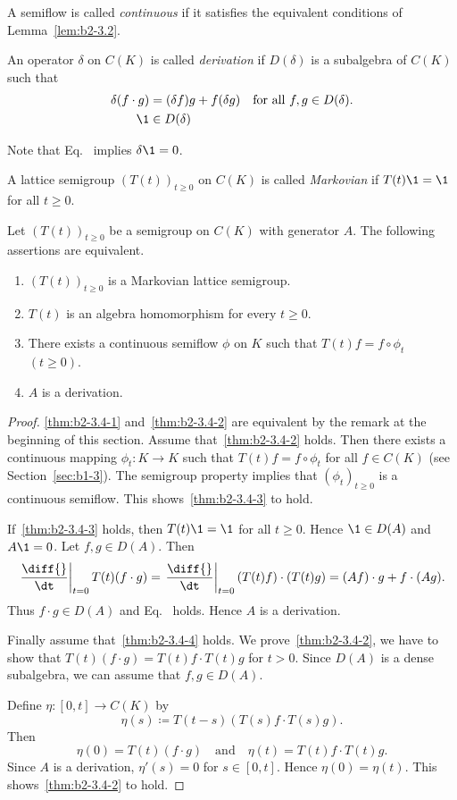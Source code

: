 A semiflow is called \emph{continuous} if it satisfies the equivalent conditions of Lemma~\ref{lem:b2-3.2}.
\begin{definition}\label{def:b2-3.3}
An operator $\delta$ on $C(K)$ is called \emph{derivation} if\/ $D(\delta)$ is a subalgebra of\/ $C(K)$ such that
\begin{align}
\delta(f \cdot g) &= (\delta f)g + f(\delta g) \quad \text{for all } f,g \in D(\delta). \label{eq:b2-3.4} \\
\1 &\in D(\delta) \label{eq:b2-3.5}
\end{align}
\end{definition}
Note that Eq.~ implies $\delta\1 = 0$.

A lattice semigroup $(T(t))_{t \geq 0}$ on $C(K)$ is called \emph{Markovian} if\/ $T(t)\1 = \1$ for all $t \geq 0$.
\begin{theorem}\label{thm:b2-3.4}
Let $(T(t))_{t \geq 0}$ be a semigroup on $C(K)$ with generator $A$.
The following assertions are equivalent.
\begin{enumerate}[\upshape (a)]
\item \label{thm:b2-3.4-1}
$(T(t))_{t \geq 0}$ is a Markovian lattice semigroup.
\item \label{thm:b2-3.4-2}
$T(t)$ is an algebra homomorphism for every $t \geq 0$.
\item \label{thm:b2-3.4-3}
There exists a continuous semiflow $\phi$ on $K$ such that $T(t)f = f \circ \phi_{t}$ $(t \geq 0)$.
\item \label{thm:b2-3.4-4}
$A$ is a derivation.
\end{enumerate}
\end{theorem}
\begin{proof}
\ref{thm:b2-3.4-1} and~\ref{thm:b2-3.4-2} are equivalent by the remark at the beginning of this section.
Assume that~\ref{thm:b2-3.4-2} holds.
Then there exists a continuous mapping $\phi_{t} \colon K \to K$ such that $T(t)f = f \circ \phi_{t}$ for all $f \in C(K)$ (see Section~\ref{sec:b1-3}).
The semigroup property implies that $(\phi_{t})_{t \geq 0}$ is a continuous semiflow.
This shows~\ref{thm:b2-3.4-3}  to hold.

If~\ref{thm:b2-3.4-3} holds, then $T(t)\1 = \1$ for all $t \geq 0$. Hence $\1 \in D(A)$ and $A\1 = 0$.
Let $f,g \in D(A)$.
Then 
%
\[
	\left.\frac{\diff{}}{\dt}\right|_{t=0} T(t)(f \cdot g) = \left.\frac{\diff{}}{\dt}\right|_{t=0} (T(t)f) \cdot (T(t)g) = (Af) \cdot g + f \cdot (Ag).
\]
%
Thus $f \cdot g \in D(A)$ and Eq.~ holds.
Hence $A$ is a derivation.

Finally assume that~\ref{thm:b2-3.4-4} holds.
We prove~\ref{thm:b2-3.4-2}, \ie  we have to show that $T(t)(f \cdot g) = T(t)f \cdot T(t)g$ for $t > 0$.
Since $D(A)$ is a dense subalgebra, we can assume that $f,g \in D(A)$.

Define $\eta \colon [0,t] \to C(K)$ by 
%
\[
	\eta(s) \coloneq T(t-s) ( T(s)f \cdot T(s)g ).
\]
%
Then 
%
\[
	\eta(0) = T(t)(f \cdot g)
	\quad \text{and} \quad
	\eta(t) = T(t)f \cdot T(t)g.
\]
%
Since $A$ is a derivation, $\eta'(s) = 0$ for $s \in [0,t]$.
Hence $\eta(0) = \eta(t)$.
This shows~\ref{thm:b2-3.4-2} to hold.
\end{proof}
